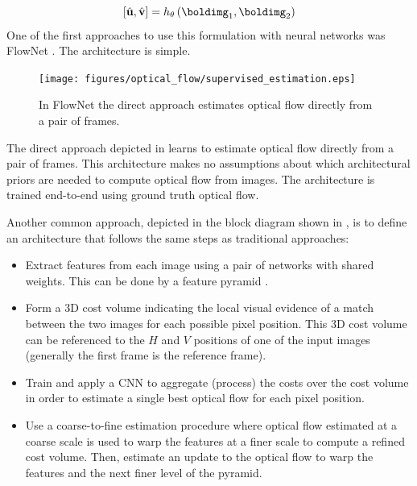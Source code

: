 \begin{equation}
\left[ \hat{\mathbf{u}}, \hat{\mathbf{v}} \right] = 
h_\theta \left( \boldimg_1, \boldimg_2 \right)
\end{equation}
One of the first approaches to use this formulation with neural networks was FlowNet \cite{Dosovitskiy2015}. The architecture is simple. 

\vspace{-.2in}
\begin{figure}[h!]
\centerline{
\texttt{[image: figures/optical\_flow/supervised\_estimation.eps]}}
\caption{In FlowNet the direct approach estimates optical flow directly from a pair of frames.}
\label{fig:supervised_estimation}
\end{figure}
\vspace{-.2in}
The direct approach depicted in \fig{\ref{fig:supervised_estimation}} learns to estimate optical flow directly from a pair of frames. This architecture makes no assumptions about which architectural priors are needed to compute optical flow from images. The architecture is trained end-to-end using ground truth optical flow. 

Another common approach, depicted in the block diagram shown in \fig{\ref{fig:supervised_estimation_modular}}, is to define an architecture that follows the same steps as traditional approaches:

\begin{itemize}
    \item Extract features from each image using a pair of networks with shared weights. This can be done by a feature pyramid \cite{Lin2017}.
    \item Form a 3D cost volume indicating the local visual evidence of a match between the two images for each possible pixel position. This 3D cost volume can be referenced to the $H$ and $V$ positions of one of the input images (generally the first frame is the reference frame).
    \item Train and apply a CNN to aggregate (process) the costs over the  cost volume in order to estimate a single best optical flow for each pixel position.  
    \item Use a coarse-to-fine estimation procedure where optical flow estimated at a coarse scale is used to warp the features at a finer scale to compute a refined cost volume. Then, estimate an update to the optical flow to warp the features and the next finer level of the pyramid.  
\end{itemize}
 
